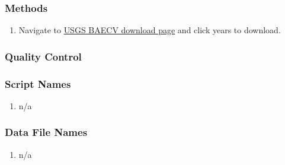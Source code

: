 \subsubsection*{Methods}
\begin{enumerate}
\item Navigate to \href{https://rmgsc.cr.usgs.gov/outgoing/baecv/BAECV_CONUS_v1.1_2017/}{USGS BAECV download page} and click years to download.
\end{enumerate}
\subsubsection*{Quality Control}
\subsubsection*{Script Names}
\begin{enumerate}
\item n/a
\end{enumerate}
\subsubsection*{Data File Names}
\begin{enumerate}
\item n/a
\end{enumerate}